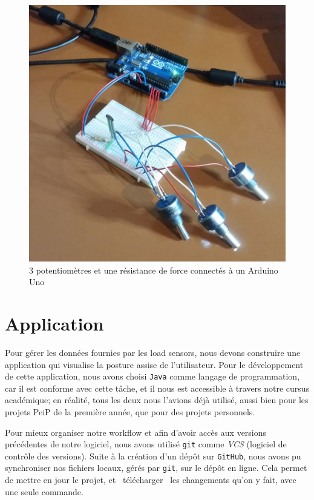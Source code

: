 \documentclass{polytech/polytech}
\begin{document}
\begin{figure}[htbp]
\begin{center}
\includegraphics[scale=0.6]{image/Arduino_v0.jpg}
\end{center}
\caption{3 potentiomètres et une résistance de force connectés à un Arduino Uno}
\label{fig:arduino_v0}
\end{figure}



\chapter{Application}
\label{chap:Application}

Pour gérer les données fournies par les load sensors, nous devons construire une application qui visualise la posture assise de l'utilisateur. Pour le développement de cette application, nous avons choisi \texttt{Java} comme langage de programmation, car il est conforme avec cette tâche, et il nous est accessible à travers notre cursus académique; en réalité, tous les deux nous l'avions déjà utilisé, aussi bien pour les projets PeiP de la première année, que pour des projets personnels.

Pour mieux organiser notre workflow et afin d'avoir accès aux versions précédentes de notre logiciel, nous avons utilisé \texttt{git} comme \textit{VCS} (logiciel de contrôle des versions). Suite à la création d'un dépôt sur \texttt{GitHub}, nous avons pu synchroniser nos fichiers locaux, gérés par \texttt{git}, sur le dépôt en ligne. Cela permet de mettre en jour le projet, et \guillemotleft\ télécharger \guillemotright\ les changements qu'on y fait, avec une seule commande.
\end{document}
